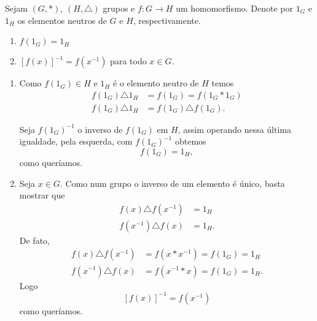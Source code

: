 \begin{proposicao}
    Sejam $(G, *)$, $(H, \triangle)$ grupos e $f : G \to H$ um homomorfismo. Denote por $1_G$ e $1_H$ os elementos neutros de $G$ e $H$, respectivamente.
    \begin{enumerate}[label={\roman*})]
        \item $f(1_G) = 1_H$
        \item $[f(x)]^{-1} = f(x^{-1})$ para todo $x \in G$.
    \end{enumerate}
\end{proposicao}
\begin{prova}
    \begin{enumerate}[label={\roman*})]
        \item Como $f(1_G) \in H$ e $1_H$ é o elemento neutro de $H$ temos
        \begin{align*}
            f(1_G) \triangle 1_H &= f(1_G) = f(1_G * 1_G)\\
            f(1_G) \triangle 1_H &= f(1_G) \triangle f(1_G).
        \end{align*}

        Seja $f(1_G)^{-1}$ o inverso de $f(1_G)$ em $H$, assim operando nessa última igualdade, pela esquerda, com $f(1_G)^{-1}$ obtemos
        \[
            f(1_G) = 1_H,
        \]
        como queríamos.

        \item Seja $x \in G$. Como num grupo o inverso de um elemento é único, basta mostrar que
        \begin{align*}
            f(x) \triangle f(x^{-1}) &= 1_H\\
            f(x^{-1}) \triangle f(x) &= 1_H.
        \end{align*}
        De fato,
        \begin{align*}
            f(x) \triangle f(x^{-1}) &= f(x * x^{-1}) = f(1_G) = 1_H\\
            f(x^{-1}) \triangle f(x) &= f(x^{-1} * x) = f(1_G) = 1_H.
        \end{align*}
        Logo
        \[
            [f(x)]^{-1} = f(x^{-1})
        \]
        como queríamos.
    \end{enumerate}
\end{prova}

